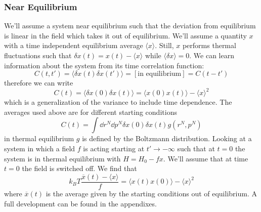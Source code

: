 \subsubsection{Near Equilibrium}
We'll assume a system near equilibrium such that the deviation from equilibrium is linear in the field which takes it out of equilibrium. We'll assume a quantity \(x\) with a time independent equilibrium average \(\langle x \rangle \). Still, \(x\) performs thermal fluctuations such that \(\delta x(t) = x(t)-\langle x \rangle \) while \(\langle \delta x \rangle = 0\). We can learn information about the system from its time correlation function:
\begin{equation}
	C(t,t') = \langle\delta x(t) \delta x(t')\rangle = [\text{in equilibrium}] = C(t-t')
\end{equation}
therefore we can write
\begin{equation}
	C(t) = \langle \delta x(0)\delta x(t) \rangle = \langle x(0)x(t)\rangle - \langle x \rangle ^2
\end{equation}
which is a generalization of the variance to include time dependence. The averages used above are for different starting conditions
\begin{equation}
	C(t) = \int \dd r^N\dd p^N \delta x(0)\delta x(t)g(r^N,p^N)
\end{equation}
in thermal equilibrium \(g\) is defined by the Boltzmann distribution. Looking at a system in which a field \(f\) is acting starting at \(t'\rightarrow-\infty \) such that at \(t=0\) the system is in thermal equilibrium with \(H=H_0-fx\). We'll assume that at time \(t=0\) the field is switched off. We find that
\begin{equation}
	k_B T \frac{\overline{x}(t)-\langle x \rangle}{f} = \langle x(t)x(0)\rangle -\langle x \rangle^2
\end{equation}
where \(\overline{x}(t)\) is the average given by the starting conditions out of equilibrium. A full development can be found in the appendixes.
\newpage

